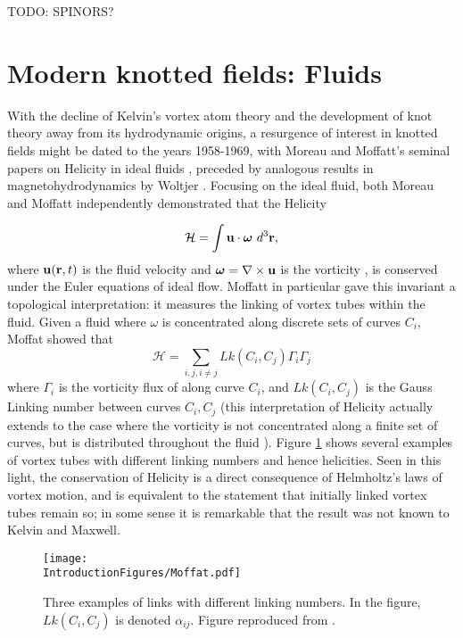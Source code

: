TODO: SPINORS?
\section{Modern knotted fields: Fluids}
\label{sec:Fluids}
With the decline of Kelvin's vortex atom theory and the development of knot theory away from its hydrodynamic origins, a resurgence of interest in knotted fields might be dated to the years 1958-1969, with Moreau and Moffatt's seminal papers on Helicity in ideal fluids \citep{Moreau1961,Moffatt1969}, preceded by analogous results in magnetohydrodynamics by Woltjer \citep{Woltjer1958}. Focusing on the ideal fluid, both Moreau and Moffatt independently demonstrated that the Helicity

\begin{equation}
    \mathcal{H} = \int {\bf u} \cdot {\boldsymbol{\omega}} \ d^3 \bf r,
\end{equation}
where ${\bf u}({\bf r},t)$ is the fluid velocity and $\boldsymbol{\omega} = \nabla \times \bf u$ is the vorticity \citep{Saffman1992}, is conserved under the Euler equations of ideal flow. Moffatt in particular gave this invariant a topological interpretation: it measures the linking of vortex tubes within the fluid. Given a fluid where $\omega$ is concentrated along discrete sets of curves $C_i$, Moffat showed that
\begin{equation}
    \mathcal{H} = \sum_{i,j, i\neq j} Lk(C_i,C_j) \Gamma_i \Gamma_j 
\end{equation}
where $\Gamma_i$ is the vorticity flux of along curve $C_i$, and $Lk(C_i,C_j)$ is the Gauss Linking number between curves $C_i, C_j$ (this interpretation of Helicity actually extends to the case where the vorticity is not concentrated along a finite set of curves, but is distributed throughout the fluid \citep{Arnold1999}). Figure \ref{fig:Moffat} shows several examples of vortex tubes with different linking numbers and hence helicities. Seen in this light, the conservation of Helicity is a direct consequence of Helmholtz's laws of vortex motion, and is equivalent to the statement that initially linked vortex tubes remain so; in some sense it is remarkable that the result was not known to Kelvin and Maxwell.
\begin{figure}[htbp]
\centering
\texttt{[image: \\IntroductionFigures/Moffat.pdf]}
\caption{Three examples of links with different linking numbers. In the figure, $Lk(C_i,C_j)$ is denoted $\alpha_{ij}$. Figure reproduced from \citep{Moffatt1969}.}
\label{fig:Moffat}
\end{figure}

